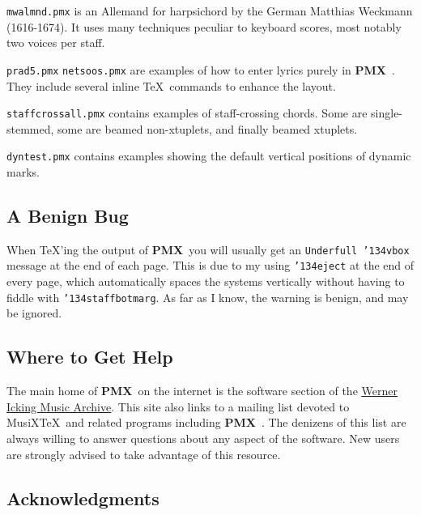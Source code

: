 \documentclass[11pt]{article}
\def\MusiXTeX{MusiX\TeX}
\def\bs{{\tt\char'134}}
\newcommand\PMXX{\textbf{PMX}}
\newcommand\PMX{\PMXX~}
\def\newfrom{2.59}  %
\def\NEW#1{\ifdim#1 pt<\newfrom pt\else%
\marginpar{\fbox{#1}}\fi}
\begin{document}
{\tt mwalmnd.pmx} is an Allemand for harpsichord by the German 
Matthias Weckmann 
(1616-1674).  It uses many techniques peculiar to keyboard scores, most notably
two voices per staff.

{\tt prad5.pmx} {\tt netsoos.pmx} are examples of how to enter lyrics purely in \PMX.
They include several inline \TeX\ commands to enhance the layout.

{\tt staffcrossall.pmx}\NEW{2.74} contains examples of staff-crossing chords. Some are 
single-stemmed, some are beamed non-xtuplets, and finally beamed xtuplets.

{\tt dyntest.pmx} contains examples showing the default vertical positions of dynamic marks.

\subsection{A Benign Bug} 

	When \TeX 'ing the output of \PMX you will usually get an {\tt Underfull 
\bs vbox} message at the end of each page.  This is due to my using 
\bs{\tt eject} at the end of every page, which automatically spaces the 
systems vertically without having to fiddle with \bs{\tt staffbotmarg}.  As far
as I know, the 
warning is benign, and may be ignored. 

\subsection{Where to Get Help} \label{where}

The main home of \PMX on the internet is the software section of the 
\href{http://icking-music-archive.org}{\underline{Werner Icking Music Archive}}. This
site also links to a mailing list devoted to \MusiXTeX\ and related programs including 
\PMX. The denizens of this list are always willing to answer questions about any 
aspect of the software. New users are strongly advised to take advantage of this
resource.

\subsection{Acknowledgments}
\end{document}
